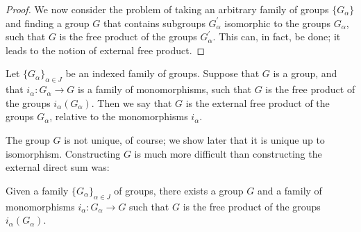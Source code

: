 \begin{proof}
We now consider the problem of taking an arbitrary family of groups \(\{ G_{\alpha }\}\) and finding a group \(G\) that contains subgroups \(G_{\alpha }^{\prime }\) isomorphic to the groups \(G_{\alpha }\), such that \(G\) is the free product of the groups \(G_{\alpha }^{\prime }\). This can, in fact, be done; it leads to the notion of external free product.
\end{proof}
\begin{definition}
Let \({\{ G_{\alpha }\} }_{\alpha \in J}\) be an indexed family of groups. Suppose that \(G\) is a group, and that \(i_{\alpha } : G_{\alpha } \rightarrow G\) is a family of monomorphisms, such that \(G\) is the free product of the groups \(i_{\alpha }( G_{\alpha })\). Then we say that \(G\) is the external free product of the groups \(G_{\alpha }\), relative to the monomorphisms \(i_{\alpha }\).
\end{definition}

The group \(G\) is not unique, of course; we show later that it is unique up to isomorphism. Constructing \(G\) is much more difficult than constructing the external direct sum was:

\begin{theorem}
\label{thm:\thetheorem}
Given a family \({\{ G_{\alpha }\} }_{\alpha \in J}\) of groups, there exists a group \(G\) and a family of monomorphisms \(i_{\alpha } : G_{\alpha } \rightarrow G\) such that \(G\) is the free product of the groups \(i_{\alpha }( G_{\alpha })\).
\end{theorem}

